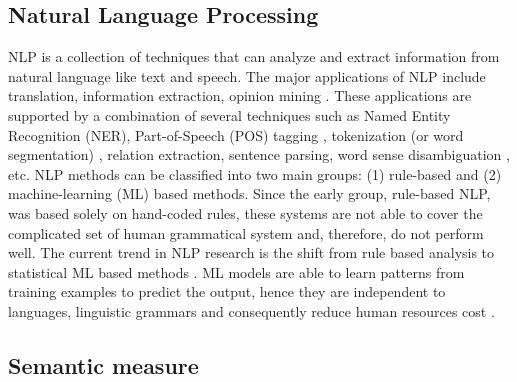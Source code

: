 \documentclass[Journal, InsideFigs, DoubleSpace]{ascelike} %
\begin{document}
\subsection{Natural Language Processing}
NLP is a collection of techniques that can analyze and extract information from natural language like text and speech. The major applications of NLP include translation, information extraction, opinion mining \cite{Cambria14}. These applications are supported by a combination of several techniques such as Named Entity Recognition (NER), Part-of-Speech (POS) tagging \cite{Toutanova03,Cunningham02}, tokenization (or word segmentation) \cite{Webster92,Zhao11}, relation extraction, sentence parsing, word sense disambiguation \cite{Lesk86,Yarowsky95,Navigli09}, etc. NLP methods can be classified into two main groups: (1) rule-based and (2) machine-learning (ML) based methods. Since the early group, rule-based NLP, was based solely on hand-coded rules, these systems are not able to cover the complicated set of human grammatical system \cite{Marcus95} and, therefore, do not perform well. The current trend in NLP research is the shift from rule based analysis to statistical ML based methods \cite{Cambria14}. ML models are able to learn patterns from training examples to predict the output, hence they are independent to languages, linguistic grammars and consequently reduce human resources cost \cite{costa-jussa12}. 

\subsection{Semantic measure}

\end{document}
